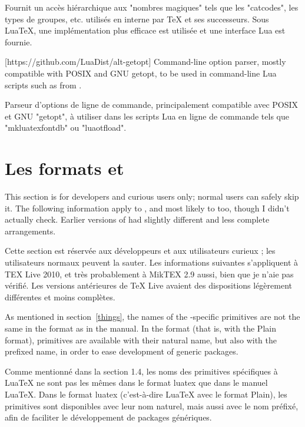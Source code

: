 \documentclass{lltxdoc}
\begin{document}
Fournit un accès hiérarchique aux "nombres magiques" tels que les "catcodes", les types de groupes, etc. utilisés en interne par TeX et ses successeurs. Sous LuaTeX, une implémentation plus efficace est utilisée et une interface Lua est fournie.

[https://github.com/LuaDist/alt-getopt]
Command-line option parser, mostly compatible with POSIX and GNU getopt, to be
used in command-line Lua scripts such as  from
.

Parseur d'options de ligne de commande, principalement compatible avec POSIX et GNU "getopt", à utiliser dans les scripts Lua en ligne de commande tels que "mkluatexfontdb" ou "luaotfload".

\section{Les formats  et }\label{formats}

This section is for developers and curious users only; normal users can safely
skip it. The following information apply to , and most likely to
 too, though I didn't actually check. Earlier versions of \texlive
had slightly different and less complete arrangements.

Cette section est réservée aux développeurs et aux utilisateurs curieux ; les utilisateurs normaux peuvent la sauter. Les informations suivantes s'appliquent à TEX Live 2010, et très probablement à MikTEX 2.9 aussi, bien que je n'aie pas vérifié. Les versions antérieures de TeX Live avaient des dispositions légèrement différentes et moins complètes.

As mentioned in section~\ref{things}, the names of the \luatex-specific
primitives are not the same in the  format as in the \luatex
manual. In the  format (that is, \luatex with the Plain format),
primitives are available with their natural name, but also with the prefixed
name, in order to ease development of generic packages.

Comme mentionné dans la section 1.4, les noms des primitives spécifiques à LuaTeX ne sont pas les mêmes dans le format luatex que dans le manuel LuaTeX. Dans le format luatex (c'est-à-dire LuaTeX avec le format Plain), les primitives sont disponibles avec leur nom naturel, mais aussi avec le nom préfixé, afin de faciliter le développement de packages génériques.
\end{document}
